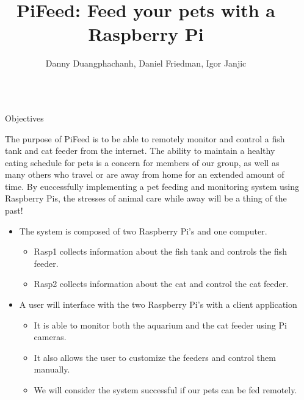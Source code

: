 \documentclass[final]{beamer}
\title{PiFeed: Feed your pets with a Raspberry Pi} %
\author{Danny Duangphachanh, Daniel Friedman, Igor Janjic} %
\institute{Bradley Department of Electrical and Computer Engineering, Virginia Tech [ECE 4564]} %
\newlength{\sepwid}
\newlength{\onecolwid}
\begin{document}

\setlength{\belowcaptionskip}{2ex} %
\setlength\belowdisplayshortskip{2ex} %

\begin{frame}[t] %

\begin{columns}[t] %

\begin{column}{\sepwid}\end{column} %

\begin{column}{\onecolwid} %


\begin{alertblock}{Objectives}

The purpose of PiFeed is to be able to remotely monitor and control a fish tank
and cat feeder from the internet. The ability to maintain a healthy
eating schedule for pets is a concern for members of our group, as well as many
others who travel or are away from home for an extended amount of time. By
euccessfully implementing a pet feeding and monitoring system using Raspberry
Pis, the stresses of animal care while away will be a thing of the past!
\begin{itemize}
    \item The system is composed of two Raspberry Pi's and one computer.
    \begin{itemize}
        \item Rasp1 collects information about the fish tank and controls the fish
        feeder.
        \item Rasp2 collects information about the cat and control the cat
        feeder.
    \end{itemize}
    \item A user will interface with the two Raspberry Pi's with a client
    application
    \begin{itemize}
        \item It is able to monitor both the aquarium and the cat feeder
        using Pi cameras.
        \item It also allows the user to customize the feeders and control them manually.
    \item We will consider the system successful if our pets can be fed
    remotely.
    \end{itemize}
\end{itemize}


\end{alertblock}
\end{column}
\end{columns}
\end{frame}
\end{document}
